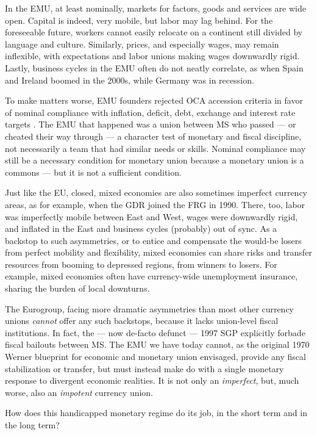 \documentclass[11pt,a4paper,oneside]{article}
\begin{document}
In the \gls{EMU}, at least nominally, markets for factors, goods and services are wide open. 
Capital is indeed, very mobile, but labor may lag behind. 
For the foreseeable future, workers cannot easily relocate on a continent still divided by language and culture. 
Similarly, prices, and especially wages, may remain inflexible, with expectations and labor unions making wages downwardly rigid. 
Lastly, business cycles in the \gls{EMU} often do not neatly correlate, as when Spain and Ireland boomed in the 2000s, while Germany was in recession.

To make matters worse, \gls{EMU} founders rejected \gls{OCA} accession criteria in favor of nominal compliance with inflation, deficit, debt, exchange and interest rate targets \citep[4]{Begg2008}. 
The \gls{EMU} that happened was a union between \gls{MS} who passed --- or cheated their way through --- a character test of monetary and fiscal discipline, not necessarily a team that had similar needs or skills. 
Nominal compliance may still be a necessary condition for monetary union because a monetary union is a commons --- but it is not a sufficient condition.

Just like the \gls{EU}, closed, mixed economies are also sometimes imperfect currency areas, as for example, when the \gls{GDR} joined the \gls{FRG} in 1990. 
There, too, labor was imperfectly mobile between East and West, wages were downwardly rigid, and inflated in the East and business cycles (probably) out of sync. 
As a backstop to such asymmetries, or to entice and compensate the would-be losers from perfect mobility and flexibility, mixed economies can share risks and transfer resources from booming to depressed regions, from winners to losers. 
For example, mixed economies often have currency-wide unemployment insurance, sharing the burden of local downturns.

The Eurogroup, facing more dramatic asymmetries than most other currency unions \emph{cannot} offer any such backstops, because it lacks union-level fiscal institutions.
In fact, the --- now de-facto defunct --- 1997 \gls{SGP} explicitly forbade fiscal bailouts between \gls{MS}. 
The \gls{EMU} we have today cannot, as the original 1970 Werner blueprint for economic and monetary union envisaged, provide any fiscal stabilization or transfer, but must instead make do with a single monetary response to divergent economic realities. 
It is not only an \emph{imperfect}, but, much worse, also an \emph{impotent} currency union.

How does this handicapped monetary regime do its job, in the short term and in the long term?
			
\end{document}
